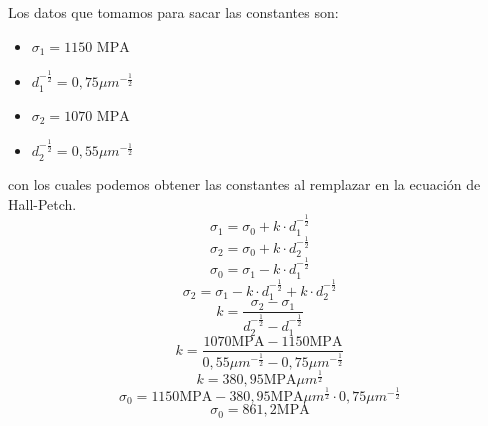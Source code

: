 \documentclass[12pt,a4paper]{article}
\begin{document}
Los datos que tomamos para sacar las constantes son:
\begin{itemize}
    \item\(\sigma_1=1150\text{ MPA}\)
    \item\(d^{-\frac{1}{2}}_1=0,75\mu m^{-\frac{1}{2}}\)
    \item\(\sigma_2=1070\text{ MPA}\)
    \item\(d^{-\frac{1}{2}}_2=0,55\mu m^{-\frac{1}{2}}\)
\end{itemize}

con los cuales podemos obtener las constantes al remplazar en la ecuación de Hall-Petch.
\begin{equation}
    \sigma_1 = \sigma_0 +k\cdot d^{-\frac{1}{2}}_1
\end{equation}
\begin{equation}
    \sigma_2 = \sigma_0 +k\cdot d^{-\frac{1}{2}}_2
\end{equation}
\begin{equation}
    \sigma_0 = \sigma_1 -k\cdot d^{-\frac{1}{2}}_1
\end{equation}
\begin{equation}
    \sigma_2 = \sigma_1 -k\cdot d^{-\frac{1}{2}}_1 +k\cdot d^{-\frac{1}{2}}_2
\end{equation}
\begin{equation}
    k = \frac{\sigma_2 - \sigma_1}{d^{-\frac{1}{2}}_2 - d^{-\frac{1}{2}}_1 }
\end{equation}
\begin{equation}
    k = \frac{1070 \text{MPA} - 1150 \text{MPA}}{0,55\mu m^{-\frac{1}{2}} - 0,75\mu m^{-\frac{1}{2}}}
\end{equation}
\begin{equation}
    k = 380,95 \text{MPA}\mu m^{\frac{1}{2}}
\end{equation}
\begin{equation}
    \sigma_0 = 1150 \text{MPA} - 380,95 \text{MPA}\mu m^{\frac{1}{2}}\cdot 0,75\mu m^{-\frac{1}{2}}
\end{equation}
\begin{equation}
    \sigma_0 = 861,2 \text{MPA} 
\end{equation}
\end{document}

